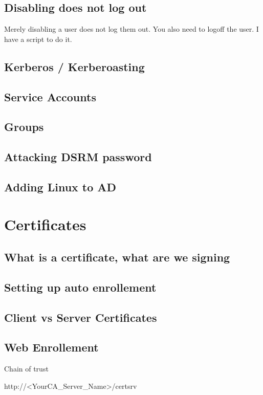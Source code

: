 \subsection{Disabling does not log out}
Merely disabling a user does not log them out. You also need to logoff the user. I have a script to do it.

\subsection{Kerberos / Kerberoasting}

\subsection{Service Accounts}

\subsection{Groups}

\subsection{Attacking DSRM password}

\subsection{Adding Linux to AD}

\section{Certificates}
\subsection{What is a certificate, what are we signing}
\subsection{Setting up auto enrollement}
\subsection{Client vs Server Certificates}

\subsection{Web Enrollement}
Chain of trust

http://<YourCA_Server_Name>/certsrv

